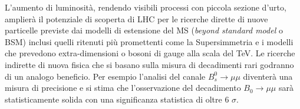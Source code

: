 L'aumento di luminosit\`a, rendendo visibili processi con piccola sezione d'urto, amplier\`a il potenziale di scoperta di LHC per le ricerche dirette di nuove particelle previste dai modelli di estensione del MS ({\em beyond standard model} o BSM) inclusi quelli ritenuti pi\`u promettenti come la Supersimmetria e i modelli che prevedono extra-dimensioni o bosoni di gauge alla scala del TeV. Le ricerche indirette di nuova fisica che si basano sulla misura di decadimenti rari godranno di un analogo beneficio. Per esempio l'analisi del canale $B^0_s\to \mu \mu$ diventer\`a una misura di precisione e si stima che l'osservazione del decadimento $B_0\to\mu\mu$ sar\`a statisticamente solida con una significanza statistica di oltre 6 $\sigma$.


